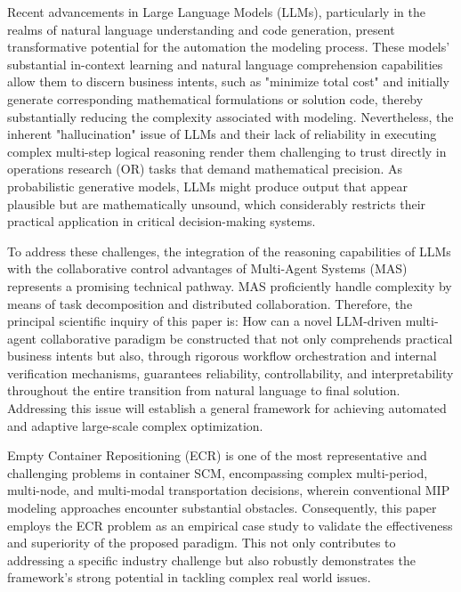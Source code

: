\documentclass[preprint,12pt]{elsarticle}
\begin{document}
Recent advancements in Large Language Models (LLMs), particularly in the realms of natural language understanding and code generation, present transformative  potential for the automation the modeling process. These models' substantial in-context learning and natural language comprehension capabilities allow them to discern business intents, such as "minimize total cost" and initially generate corresponding mathematical formulations or solution code, thereby substantially reducing the complexity associated with modeling. Nevertheless, the inherent "hallucination" issue of LLMs and their lack of reliability in executing complex multi-step logical reasoning render them challenging to trust directly in operations research (OR) tasks that demand mathematical precision. As probabilistic generative models, LLMs might produce output that appear plausible but are mathematically unsound, which considerably restricts their practical application in critical decision-making systems.

To address these challenges, the integration of the reasoning capabilities of LLMs with the collaborative control advantages of Multi-Agent Systems (MAS) represents a promising technical pathway. MAS proficiently handle complexity by means of task decomposition and distributed collaboration. Therefore, the principal scientific inquiry of this paper is: How can a novel LLM-driven multi-agent collaborative paradigm be constructed that not only comprehends practical business intents but also, through rigorous workflow orchestration and internal verification mechanisms, guarantees reliability, controllability, and interpretability throughout the entire transition from natural language to final solution. Addressing this issue will establish a general framework for achieving automated and adaptive large-scale complex optimization.

Empty Container Repositioning (ECR) is one of the most representative and challenging problems in container SCM, encompassing complex multi-period, multi-node, and multi-modal transportation decisions, wherein conventional MIP modeling approaches encounter substantial obstacles. Consequently, this paper employs the ECR problem as an empirical case study to validate the effectiveness and superiority of the proposed paradigm. This not only contributes to addressing a specific industry challenge but also robustly demonstrates the framework's strong potential in tackling complex real world issues.
\end{document}
